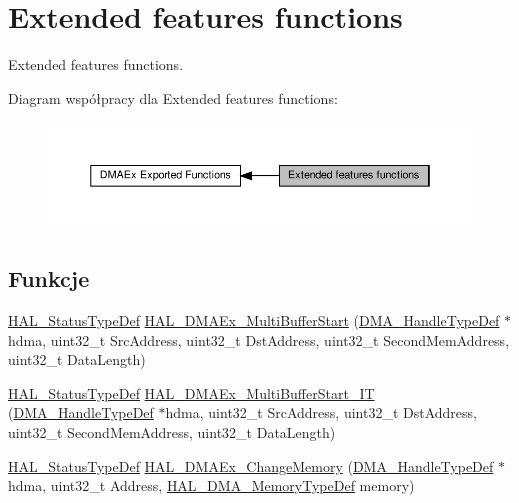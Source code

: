 \hypertarget{group___d_m_a_ex___exported___functions___group1}{}\section{Extended features functions}
\label{group___d_m_a_ex___exported___functions___group1}


Extended features functions.  


Diagram współpracy dla Extended features functions\+:\nopagebreak
\begin{figure}[H]
\begin{center}
\leavevmode
\includegraphics[width=350pt]{group___d_m_a_ex___exported___functions___group1}
\end{center}
\end{figure}
\subsection*{Funkcje}
\begin{DoxyCompactItemize}
\item 
\hyperlink{stm32f4xx__hal__def_8h_a63c0679d1cb8b8c684fbb0632743478f}{H\+A\+L\+\_\+\+Status\+Type\+Def} \hyperlink{group___d_m_a_ex___exported___functions___group1_ga391ed9cf0e2220420b21b3a9e8098d89}{H\+A\+L\+\_\+\+D\+M\+A\+Ex\+\_\+\+Multi\+Buffer\+Start} (\hyperlink{group___d_m_a___exported___types_ga41b754a906b86bce54dc79938970138b}{D\+M\+A\+\_\+\+Handle\+Type\+Def} $\ast$hdma, uint32\+\_\+t Src\+Address, uint32\+\_\+t Dst\+Address, uint32\+\_\+t Second\+Mem\+Address, uint32\+\_\+t Data\+Length)
\item 
\hyperlink{stm32f4xx__hal__def_8h_a63c0679d1cb8b8c684fbb0632743478f}{H\+A\+L\+\_\+\+Status\+Type\+Def} \hyperlink{group___d_m_a_ex___exported___functions___group1_gaeffe492a7bbfa25291075b37eefc5152}{H\+A\+L\+\_\+\+D\+M\+A\+Ex\+\_\+\+Multi\+Buffer\+Start\+\_\+\+IT} (\hyperlink{group___d_m_a___exported___types_ga41b754a906b86bce54dc79938970138b}{D\+M\+A\+\_\+\+Handle\+Type\+Def} $\ast$hdma, uint32\+\_\+t Src\+Address, uint32\+\_\+t Dst\+Address, uint32\+\_\+t Second\+Mem\+Address, uint32\+\_\+t Data\+Length)
\item 
\hyperlink{stm32f4xx__hal__def_8h_a63c0679d1cb8b8c684fbb0632743478f}{H\+A\+L\+\_\+\+Status\+Type\+Def} \hyperlink{group___d_m_a_ex___exported___functions___group1_ga34e846eb937e392bb3baa475e1407390}{H\+A\+L\+\_\+\+D\+M\+A\+Ex\+\_\+\+Change\+Memory} (\hyperlink{group___d_m_a___exported___types_ga41b754a906b86bce54dc79938970138b}{D\+M\+A\+\_\+\+Handle\+Type\+Def} $\ast$hdma, uint32\+\_\+t Address, \hyperlink{group___d_m_a_ex___exported___types_ga9cec283a461e47eda968838c35fd6eed}{H\+A\+L\+\_\+\+D\+M\+A\+\_\+\+Memory\+Type\+Def} memory)
\end{DoxyCompactItemize}


